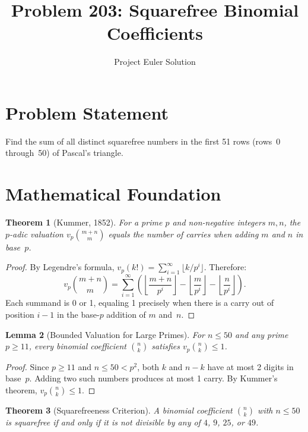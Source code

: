 \documentclass[12pt]{article}
\title{Problem 203: Squarefree Binomial Coefficients}
\author{Project Euler Solution}
\date{}
\newtheorem{theorem}{Theorem}
\newtheorem{lemma}[theorem]{Lemma}
\begin{document}
\maketitle

\section{Problem Statement}
Find the sum of all distinct squarefree numbers in the first 51 rows (rows~0 through~50)
of Pascal's triangle.

\section{Mathematical Foundation}

\begin{theorem}[Kummer, 1852]
For a prime $p$ and non-negative integers $m, n$, the $p$-adic valuation
$v_p\binom{m+n}{m}$ equals the number of carries when adding $m$ and $n$ in base~$p$.
\end{theorem}

\begin{proof}
By Legendre's formula, $v_p(k!) = \sum_{i=1}^{\infty} \lfloor k/p^i \rfloor$. Therefore:
\[
v_p\binom{m+n}{m} = \sum_{i=1}^{\infty}\left(
\left\lfloor\frac{m+n}{p^i}\right\rfloor
- \left\lfloor\frac{m}{p^i}\right\rfloor
- \left\lfloor\frac{n}{p^i}\right\rfloor\right).
\]
Each summand is 0 or 1, equaling 1 precisely when there is a carry out of position $i-1$
in the base-$p$ addition of $m$ and~$n$.
\end{proof}

\begin{lemma}[Bounded Valuation for Large Primes]
For $n \leq 50$ and any prime $p \geq 11$, every binomial coefficient $\binom{n}{k}$
satisfies $v_p\binom{n}{k} \leq 1$.
\end{lemma}

\begin{proof}
Since $p \geq 11$ and $n \leq 50 < p^2$, both $k$ and $n-k$ have at most 2 digits in
base~$p$. Adding two such numbers produces at most 1 carry. By Kummer's theorem,
$v_p\binom{n}{k} \leq 1$.
\end{proof}

\begin{theorem}[Squarefreeness Criterion]
A binomial coefficient $\binom{n}{k}$ with $n \leq 50$ is squarefree if and only if
it is not divisible by any of $4$, $9$, $25$, or $49$.
\end{theorem}
\end{document}
